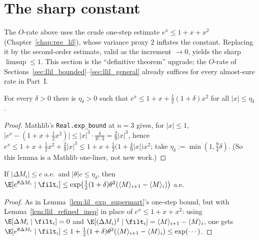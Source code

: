 \section{The sharp constant}
\label{sec:llil_sharp}

The $O$-rate above uses the crude one-step estimate $e^x\le1+x+x^2$
(Chapter~\ref{chap:pre_lil}), whose variance proxy $2$ inflates the constant. Replacing
it by the second-order estimate, valid as the increment $\to0$, yields the sharp
$\limsup\le1$. This section is the ``definitive theorem'' upgrade; the $O$-rate of
Sections~\ref{sec:llil_bounded}--\ref{sec:llil_general} already suffices for every
almost-sure rate in Part~I.

\begin{lemma}\label{lem:llil_refined_ineq}
\leanok
For every $\delta>0$ there is $\eta_\delta>0$ such that $e^x\le1+x+\tfrac12(1+\delta)x^2$
for all $|x|\le\eta_\delta$.
\end{lemma}
\begin{proof}\leanok
Mathlib's \texttt{Real.exp\_bound} at $n=3$ gives, for $|x|\le1$,
$\big|e^x-(1+x+\tfrac12 x^2)\big|\le|x|^3\cdot\tfrac{4}{3!\cdot3}=\tfrac29|x|^3$, hence
$e^x\le1+x+\tfrac12 x^2+\tfrac29|x|^3\le1+x+\tfrac12\big(1+\tfrac49|x|\big)x^2$; take
$\eta_\delta:=\min(1,\tfrac94\delta)$. (So this lemma is a Mathlib one-liner, not new work.)
\end{proof}

\begin{lemma}\label{lem:llil_refined_mgf}
\leanok
{}
If $|\Delta M_i|\le c$ a.e.\ and $|\theta|c\le\eta_\delta$, then
$\E[e^{\theta\Delta M_i}\mid\filt_i]\le\exp\!\big(\tfrac12(1+\delta)\theta^2
(\langle M\rangle_{i+1}-\langle M\rangle_i)\big)$ a.e.
\end{lemma}
\begin{proof}
As in Lemma~\ref{lem:lil_exp_supermart}'s one-step bound, but with
Lemma~\ref{lem:llil_refined_ineq} in place of $e^x\le1+x+x^2$: using
$\E[\Delta M_i\mid\filt_i]=0$ and $\E[(\Delta M_i)^2\mid\filt_i]=\langle M\rangle_{i+1}
-\langle M\rangle_i$, one gets
$\E[e^{\theta\Delta M_i}\mid\filt_i]\le1+\tfrac12(1+\delta)\theta^2
(\langle M\rangle_{i+1}-\langle M\rangle_i)\le\exp(\cdots)$.
\end{proof}

